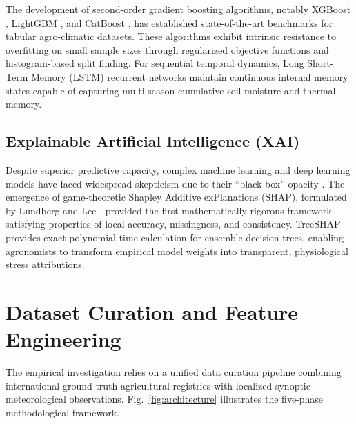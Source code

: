 \documentclass[conference]{IEEEtran}
\begin{document}
The development of second-order gradient boosting algorithms, notably XGBoost \cite{chen2016xgboost}, LightGBM \cite{ke2017lightgbm}, and CatBoost \cite{prokhorenkova2018catboost}, has established state-of-the-art benchmarks for tabular agro-climatic datasets. These algorithms exhibit intrinsic resistance to overfitting on small sample sizes through regularized objective functions and histogram-based split finding. For sequential temporal dynamics, Long Short-Term Memory (LSTM) recurrent networks \cite{hochreiter1997long} maintain continuous internal memory states capable of capturing multi-season cumulative soil moisture and thermal memory.

\subsection{Explainable Artificial Intelligence (XAI)}
Despite superior predictive capacity, complex machine learning and deep learning models have faced widespread skepticism due to their ``black box'' opacity \cite{lundberg2017unified}. The emergence of game-theoretic Shapley Additive exPlanations (SHAP), formulated by Lundberg and Lee \cite{lundberg2017unified}, provided the first mathematically rigorous framework satisfying properties of local accuracy, missingness, and consistency. TreeSHAP provides exact polynomial-time calculation for ensemble decision trees, enabling agronomists to transform empirical model weights into transparent, physiological stress attributions.

\section{Dataset Curation and Feature Engineering}
The empirical investigation relies on a unified data curation pipeline combining international ground-truth agricultural registries with localized synoptic meteorological observations. Fig.~\ref{fig:architecture} illustrates the five-phase methodological framework.
\end{document}
